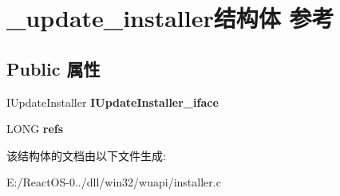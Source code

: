\hypertarget{struct__update__installer}{}\section{\+\_\+update\+\_\+installer结构体 参考}
\label{struct__update__installer}
\subsection*{Public 属性}
\begin{DoxyCompactItemize}
\item 
\mbox{\label{struct__update__installer_af0e3447f7cacbf5f956380a363300832}} 
I\+Update\+Installer {\bfseries I\+Update\+Installer\+\_\+iface}
\item 
\mbox{\label{struct__update__installer_aa5da9da3acbb04ce12a6f2679c242643}} 
L\+O\+NG {\bfseries refs}
\end{DoxyCompactItemize}


该结构体的文档由以下文件生成\+:\begin{DoxyCompactItemize}
\item 
E\+:/\+React\+O\+S-\/0../dll/win32/wuapi/installer.\+c\end{DoxyCompactItemize}
